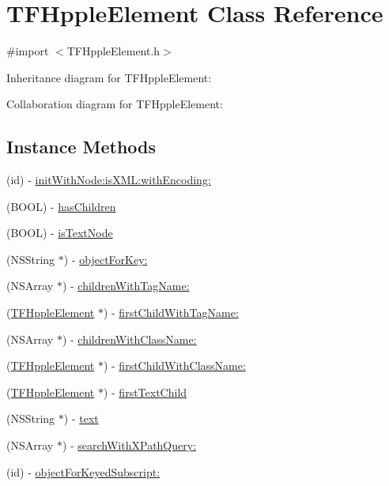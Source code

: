 \hypertarget{interface_t_f_hpple_element}{}\section{T\+F\+Hpple\+Element Class Reference}
\label{interface_t_f_hpple_element}


{\ttfamily \#import $<$T\+F\+Hpple\+Element.\+h$>$}



Inheritance diagram for T\+F\+Hpple\+Element\+:


Collaboration diagram for T\+F\+Hpple\+Element\+:
\subsection*{Instance Methods}
\begin{DoxyCompactItemize}
\item 
(id) -\/ \hyperlink{interface_t_f_hpple_element_a96f0b88ecc6a2d995db83adc29c651a0}{init\+With\+Node\+:is\+X\+M\+L\+:with\+Encoding\+:}
\item 
(B\+O\+O\+L) -\/ \hyperlink{interface_t_f_hpple_element_ad3bc62dda4b012f0fa3db18de0fc4bdb}{has\+Children}
\item 
(B\+O\+O\+L) -\/ \hyperlink{interface_t_f_hpple_element_aa8dfd3d004a8426a8768d0b9895be6c8}{is\+Text\+Node}
\item 
(N\+S\+String $\ast$) -\/ \hyperlink{interface_t_f_hpple_element_aed2c4dacaa682b1922bb04ef4aa44994}{object\+For\+Key\+:}
\item 
(N\+S\+Array $\ast$) -\/ \hyperlink{interface_t_f_hpple_element_a4ec6f4d6b0cb04ed9a19c392226034bd}{children\+With\+Tag\+Name\+:}
\item 
(\hyperlink{interface_t_f_hpple_element}{T\+F\+Hpple\+Element} $\ast$) -\/ \hyperlink{interface_t_f_hpple_element_a54c3359b7e1ca0bca26c4e6ff0473c9b}{first\+Child\+With\+Tag\+Name\+:}
\item 
(N\+S\+Array $\ast$) -\/ \hyperlink{interface_t_f_hpple_element_a33bda9b36b3a6b6cb8aa3191e4d8081d}{children\+With\+Class\+Name\+:}
\item 
(\hyperlink{interface_t_f_hpple_element}{T\+F\+Hpple\+Element} $\ast$) -\/ \hyperlink{interface_t_f_hpple_element_ae19ca4aaac4865f61f02e81869394c76}{first\+Child\+With\+Class\+Name\+:}
\item 
(\hyperlink{interface_t_f_hpple_element}{T\+F\+Hpple\+Element} $\ast$) -\/ \hyperlink{interface_t_f_hpple_element_a73a7c62150c93492a29364763a0e2704}{first\+Text\+Child}
\item 
(N\+S\+String $\ast$) -\/ \hyperlink{interface_t_f_hpple_element_a45cde91bb698bdbb03f4c48a896b031a}{text}
\item 
(N\+S\+Array $\ast$) -\/ \hyperlink{interface_t_f_hpple_element_af82deb9f4a9a92339829b9bab17ab9b9}{search\+With\+X\+Path\+Query\+:}
\item 
(id) -\/ \hyperlink{interface_t_f_hpple_element_ae1c9cc9af79c5a5b41d19188444a43f7}{object\+For\+Keyed\+Subscript\+:}
\end{DoxyCompactItemize}
